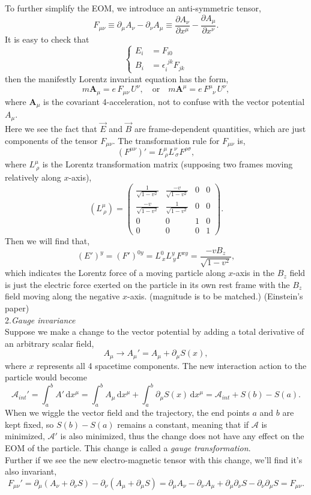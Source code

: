 \documentclass{article}
\newcommand{\be}{\begin{equation}}
\newcommand{\ee}{\end{equation}}
\newcommand{\ba}{\begin{array}}
\newcommand{\ea}{\end{array}}
\newcommand{\dif}{\,\mathrm{d}}
\newcommand{\p}{\partial}
\newcommand{\1}{\left}
\newcommand{\2}{\right}
\newcommand{\ma}{\mathcal}
\newcommand{\m}{\mu}
\newcommand{\n}{\nu}
\begin{document}
To further simplify the EOM, we introduce an anti-symmetric tensor,
\be
F_{\mu\nu} \equiv \p_\mu A_\nu - \p_\nu A_\mu \equiv \frac{\p A_\nu}{\p x^\mu}-\frac{\p A_\mu}{\p x^\nu}.
\ee
It is easy to check that
\be\1\{\begin{split}
E_i &= F_{i0} \\
B_i &= \epsilon_i^{\phantom{i}jk} F_{jk}
\end{split}\2.\ee
then the manifestly Lorentz invariant equation has the form,
\be
m \textbf{A}_\mu = e \,F_{\mu\nu}\, U^\nu, \quad\text{or}\quad m \textbf{A}^\mu = e \,F^\mu_{\phantom{\mu}\nu}\, U^\nu,
\ee
where $\textbf{A}_\mu$ is the covariant 4-acceleration, not to confuse with the vector potential $A_\mu$.\\
Here we see the fact that $\vec E$ and $\vec B$ are frame-dependent quantities, which are just components of the tensor $F_{\mu\nu}$. The transformation rule for $F_{\mu\nu}$ is,
\be
(F^{\m\n})' = L^\m_{\ \rho} L^\n_{\ \sigma} F^{\rho\sigma},
\ee
where $L^\m_{\ \rho}$ is the Lorentz transformation matrix (supposing two frames moving relatively along $x$-axis),
\be
(L^\m_{\ \rho}) = \1(\ba{cccc} \frac 1 {\sqrt{1-v^2}} & \frac{-v}{\sqrt{1-v^2}} &0&0\\ \frac{-v}{\sqrt{1-v^2}} &\frac 1 {\sqrt{1-v^2}}&0&0 \\ 0&0&1&0\\ 0&0&0&1  \ea\2).
\ee
Then we will find that,
\be
(E')^y = (F')^{0y} = L^0_{\ x} L^y_{\ y} F^{xy} = \frac{-vB_z}{\sqrt{1-v^2}},
\ee
which indicates the Lorentz force of a moving particle along $x$-axis in the $B_z$ field is just the electric force exerted on the particle in its own rest frame with the $B_z$ field moving along the negative $x$-axis. (magnitude is to be matched.) (Einstein's paper)\\

2.\textsl{Gauge invariance}\\

Suppose we make a change to the vector potential by adding a total derivative of an arbitrary scalar field,
\be
A_\mu \rightarrow A_\mu' = A_\mu + \p_\mu S(x),
\ee
where $x$ represents all 4 spacetime components. The new interaction action to the particle would become
\be
\ma A_{int}'=\int_a^b A' \dif x^\mu = \int_a^b A_\mu \dif x^\mu+\int_a^b \p_\mu S(x) \dif x^\mu=\ma A_{int} +S(b)-S(a).
\ee
When we wiggle the vector field and the trajectory, the end points $a$ and $b$ are kept fixed, so $S(b)-S(a)$ remains a constant, meaning that if $\ma A$ is minimized, $\ma A'$ is also minimized, thus the change does not have any effect on the EOM of the particle. This change is called a \textit{gauge transformation}.\\
Further if we see the new electro-magnetic tensor with this change, we'll find it's also invariant,
\be
F_{\mu\nu}'=\p_\mu(A_\nu+\p_\nu S)-\p_\nu(A_\mu+\p_\mu S)=\p_\mu A_\nu-\p_\nu A_\mu +\p_\mu\p_\nu S-\p_\nu\p_\mu S=F_{\mu\nu}.
\ee
\end{document}
